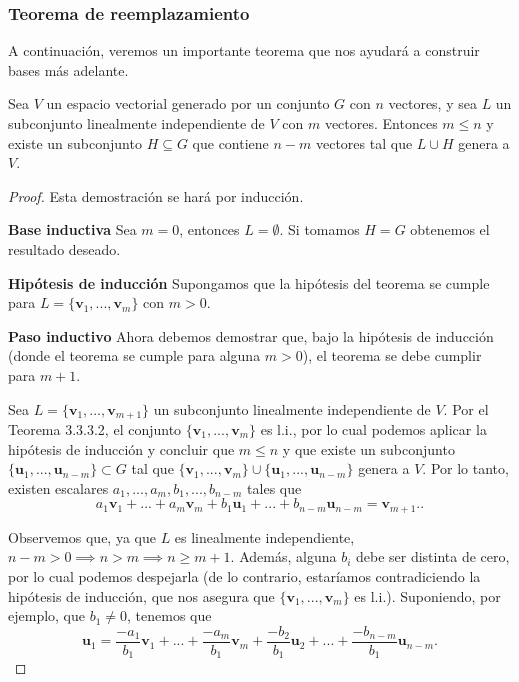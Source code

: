 \documentclass[12pt]{article}
\newenvironment{teorema}[2][Teorema]{\begin{trivlist}
\item[\hskip \labelsep {\bfseries #1}\hskip \labelsep {\bfseries #2.}]}{\end{trivlist}}
\begin{document}
\subsubsection{Teorema de reemplazamiento}

A continuación, veremos un importante teorema que nos ayudará a construir bases más adelante.

\begin{teorema} {4.1.1}
    Sea $V$ un espacio vectorial generado por un conjunto $G$ con $n$ vectores, y sea $L$ un subconjunto linealmente independiente de $V$ con $m$ vectores. Entonces $m\le n$ y existe un subconjunto $H\subseteq G$ que contiene $n-m$ vectores tal que $L\cup H$ genera a $V$.

    \begin{proof}
        Esta demostración se hará por inducción.

    \vspace{3mm} 
    \textbf{Base inductiva}
    Sea $m=0$, entonces $L=\emptyset$. Si tomamos $H=G$ obtenemos el resultado deseado.

    \vspace{3mm} 
    \textbf{Hipótesis de inducción}
    Supongamos que la hipótesis del teorema se cumple para $L=\{\mathbf{v}_1,...,\mathbf{v}_m\}$ con $m>0$.

    \vspace{3mm} 
    \textbf{Paso inductivo}
    Ahora debemos demostrar que, bajo la hipótesis de inducción (donde el teorema se cumple para alguna $m>0$), el teorema se debe cumplir para $m+1$.\vspace{3mm}
    
     Sea $L=\{\mathbf{v}_1,...,\mathbf{v}_{m+1}\}$ un subconjunto linealmente independiente de $V$. Por el Teorema 3.3.3.2, el conjunto $\{\mathbf{v}_1,...,\mathbf{v}_m\}$ es l.i., por lo cual podemos aplicar la hipótesis de inducción y concluir que $m\le n$ y que existe un subconjunto $\{\mathbf{u}_1,...,\mathbf{u}_{n-m}\}\subset G$ tal que $\{\mathbf{v}_1,...,\mathbf{v}_m\}\cup\{\mathbf{u}_1,...,\mathbf{u}_{n-m}\}$ genera a $V$. Por lo tanto, existen escalares $a_1,...,a_m,b_1,...,b_{n-m}$ tales que \[
        a_1\mathbf{v}_1+...+a_m\mathbf{v}_m+b_1\mathbf{u}_1+...+b_{n-m}\mathbf{u}_{n-m}=\mathbf{v}_{m+1}.
    .\] 

    Observemos que, ya que $L$ es linealmente independiente, $n-m>0\implies n>m\implies n\ge m+1$. Además, alguna $b_i$ debe ser distinta de cero, por lo cual podemos despejarla (de lo contrario, estaríamos contradiciendo la hipótesis de inducción, que nos asegura que $\{\mathbf{v}_1,...,\mathbf{v}_m\}$ es l.i.). Suponiendo, por ejemplo, que $b_1\neq 0$, tenemos que \[
        \mathbf{u}_1=\frac{-a_1}{b_1}\mathbf{v}_1+...+\frac{-a_m}{b_1}\mathbf{v}_m+\frac{-b_2}{b_1}\mathbf{u}_2+...+\frac{-b_{n-m}}{b_1}\mathbf{u}_{n-m}
    .\] 


\end{proof}
\end{teorema}
\end{document}

